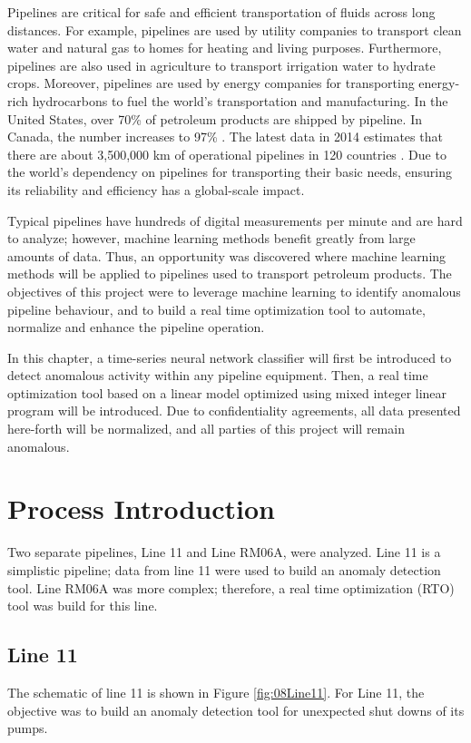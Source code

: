 Pipelines are critical for safe and efficient transportation of fluids across long distances.  For example, pipelines are used by utility companies to transport clean water and natural gas to homes for heating and living purposes.  Furthermore, pipelines are also used in agriculture to transport irrigation water to hydrate crops.  Moreover, pipelines are used by energy companies for transporting energy-rich hydrocarbons to fuel the world's transportation and manufacturing. In the United States, over 70\% of petroleum products are shipped by pipeline.  In Canada, the number increases to 97\% \cite{pipeline_transport}.  The latest data in 2014 estimates that there are about 3,500,000 km of operational pipelines in 120 countries \cite{CIA_pipeline}. Due to the world's dependency on pipelines for transporting their basic needs, ensuring its reliability and efficiency has a global-scale impact.

Typical pipelines have hundreds of digital measurements per minute and are hard to analyze; however, machine learning methods benefit greatly from large amounts of data. Thus, an opportunity was discovered where machine learning methods will be applied to pipelines used to transport petroleum products. The objectives of this project were to leverage machine learning to identify anomalous pipeline behaviour, and to build a real time optimization tool to automate, normalize and enhance the pipeline operation.

In this chapter, a time-series neural network classifier will first be introduced to detect anomalous activity within any pipeline equipment.  Then, a real time optimization tool based on a linear model optimized using mixed integer linear program will be introduced.  Due to confidentiality agreements, all data presented here-forth will be normalized, and all parties of this project will remain anomalous.

\section{Process Introduction}
Two separate pipelines, Line 11 and Line RM06A, were analyzed.  Line 11 is a simplistic pipeline; data from line 11 were used to build an anomaly detection tool.  Line RM06A was more complex; therefore, a real time optimization (RTO) tool was build for this line.

\subsection{Line 11}
The schematic of line 11 is shown in Figure \ref{fig:08Line11}. For Line 11, the objective was to build an anomaly detection tool for unexpected shut downs of its pumps.  

